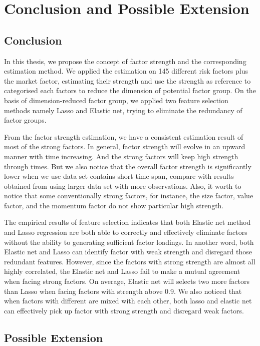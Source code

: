 	\chapter{Conclusion and Possible Extension}\label{Conclusion}
		\section{Conclusion}
In this thesis, we propose the concept of factor strength and the corresponding estimation method.
We applied the estimation on 145 different risk factors plus the market factor, estimating their strength and use the strength as reference to categorised each factors to reduce the dimension of potential factor group.
On the basis of dimension-reduced factor group, we applied two feature selection methods namely Lasso and Elastic net, trying to eliminate the redundancy of factor groups. 

From the factor strength estimation, we have a consistent estimation result of most of the strong factors.
In general, factor strength will evolve in an upward manner with time increasing.
And the strong factors will keep high strength through times.
But we also notice that the overall factor strength is significantly lower when we use data set contains short time-span, compare with results obtained from using larger data set with more observations.
Also, it worth to notice that some conventionally strong factors, for instance, the size factor, value factor, and the momentum factor do not show particular high strength.

The empirical results of feature selection indicates that both Elastic net method and Lasso regression are both able to correctly and effectively eliminate factors without the ability to generating sufficient factor loadings.
In another word, both Elastic net and Lasso can identify factor with weak strength and disregard those redundant features.
However, since the factors with strong strength are almost all highly correlated, the Elastic net and Lasso fail to make a mutual agreement when facing strong factors.
On average, Elastic net will selects two more factors than Lasso when facing factors with strength above 0.9.
We also noticed that when factors with different are mixed with each other, both lasso and elastic net can effectively pick up factor with strong strength and disregard weak factors.

\section{Possible Extension}

